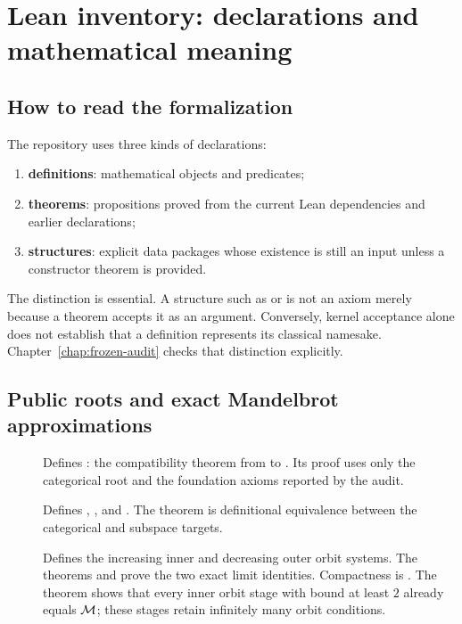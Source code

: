 \chapter[Lean declaration inventory]{Lean inventory: declarations and mathematical meaning}
\label{chap:lean-inventory}
\begingroup
\raggedright

\section{How to read the formalization}

The repository uses three kinds of declarations:
\begin{enumerate}
\item \textbf{definitions}: mathematical objects and predicates;
\item \textbf{theorems}: propositions proved from the current Lean
      dependencies and earlier declarations;
\item \textbf{structures}: explicit data packages whose existence is still
      an input unless a constructor theorem is provided.
\end{enumerate}
The distinction is essential.  A structure such as
 or  is not an axiom merely
because a theorem accepts it as an argument.
Conversely, kernel acceptance alone does not establish that a definition
represents its classical namesake.  Chapter~\ref{chap:frozen-audit}
checks that distinction explicitly.

\section{Public roots and exact Mandelbrot approximations}

\begin{description}
\item[]
Defines : the compatibility theorem from
 to .  Its proof uses only the
categorical root and the foundation axioms reported by the audit.

\item[]
Defines ,
, and
.  The theorem
 is definitional equivalence between
the categorical and subspace targets.

\item[]
Defines the increasing inner and decreasing outer orbit systems.  The
theorems
 and
 prove the two exact
limit identities.  Compactness is
.
The theorem 
shows that every inner orbit stage with bound at least $2$ already
equals $\mathcal M$; these stages retain infinitely many orbit conditions.
\end{description}

